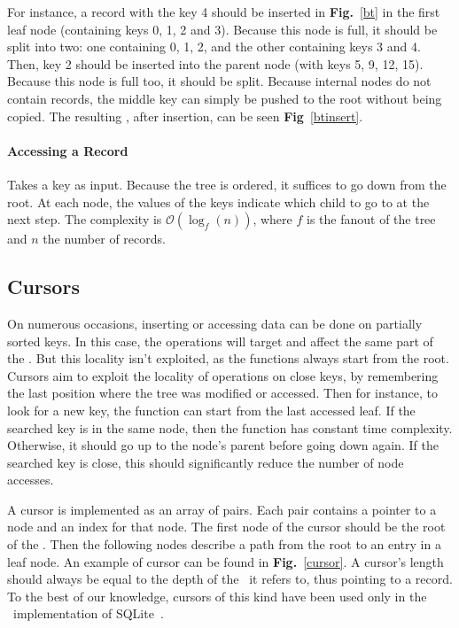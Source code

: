 For instance, a record with the key 4 should be inserted in \textbf{Fig.}~\ref{bt} in the first leaf node (containing keys 0, 1, 2 and 3).
Because this node is full, it should be split into two: one containing 0, 1, 2, and the other containing keys 3 and 4.
Then, key 2 should be inserted into the parent node (with keys 5, 9, 12, 15).
Because this node is full too, it should be split.
Because internal nodes do not contain records, the middle key can simply be pushed to the root without being copied.
The resulting \btree, after insertion, can be seen \textbf{Fig}~\ref{btinsert}.

\beforeinsert
\afterinsert

\paragraph{Accessing a Record} Takes a key as input. Because the tree is ordered, it suffices to go down from the root.
At each node, the values of the keys indicate which child to go to at the next step.
The complexity is $\mathcal{O}(\log_{f}(n))$, where $f$ is the fanout of the tree and $n$ the number of records.

\subsection{Cursors}
On numerous occasions, inserting or accessing data can be done on partially sorted keys.
In this case, the operations will target and affect the same part of the \btree.
But this locality isn't exploited, as the functions always start from the root.
Cursors aim to exploit the locality of operations on close keys, by remembering the last position where the tree was modified or accessed.
Then for instance, to look for a new key, the function can start from the last accessed leaf. If the searched key is in the same node, then the function has constant time complexity.
Otherwise, it should go up to the node's parent before going down again. If the searched key is close, this should significantly reduce the number of node accesses.

A cursor is implemented as an array of pairs. Each pair contains a pointer to a node and an index for that node.
The first node of the cursor should be the root of the \btree.
Then the following nodes describe a path from the root to an entry in a leaf node.
An example of cursor can be found in \textbf{Fig.}~\ref{cursor}.
A cursor's length should always be equal to the depth of the \btree\ it refers to, thus pointing to a record.
To the best of our knowledge, cursors of this kind have been used only in the \btrees\ implementation of SQLite~\cite{sqlite}.

